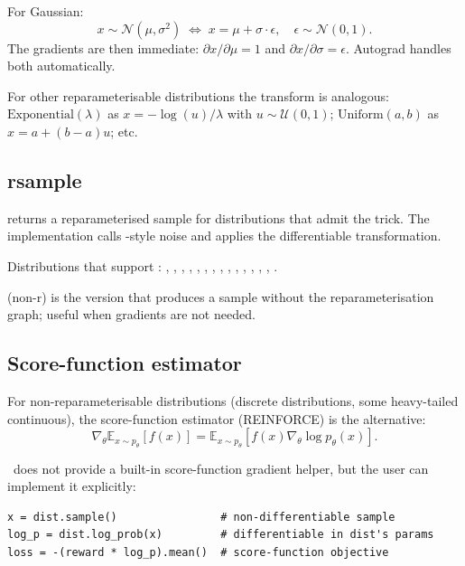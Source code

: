 For Gaussian:
\[
x \sim \mathcal{N}(\mu, \sigma^2)
\;\Longleftrightarrow\;
x = \mu + \sigma \cdot \epsilon,
\quad \epsilon \sim \mathcal{N}(0, 1).
\]
The gradients are then immediate:
$\partial x / \partial \mu = 1$ and $\partial x / \partial \sigma
= \epsilon$. Autograd handles both automatically.

For other reparameterisable distributions the transform is
analogous: $\mathrm{Exponential}(\lambda)$ as $x = -\log(u)/\lambda$
with $u \sim \mathcal{U}(0, 1)$; $\mathrm{Uniform}(a, b)$ as $x =
a + (b - a) u$; etc.

\subsection{rsample}
\label{ssec:distributions:rsample}

 returns a reparameterised sample for
distributions that admit the trick. The implementation calls
-style noise and applies the differentiable
transformation.

Distributions that support : ,
, , , ,
, , ,
, , ,
, , ,
.

 (non-r) is the version that produces a sample
without the reparameterisation graph; useful when gradients are
not needed.

\subsection{Score-function estimator}
\label{ssec:distributions:score_function}

For non-reparameterisable distributions (discrete distributions,
some heavy-tailed continuous), the score-function estimator
(REINFORCE) is the alternative:
\[
\nabla_\theta \mathbb{E}_{x \sim p_\theta}[f(x)] =
\mathbb{E}_{x \sim p_\theta}[f(x) \nabla_\theta \log p_\theta(x)].
\]

\Lucid\ does not provide a built-in score-function gradient
helper, but the user can implement it explicitly:

\begin{lstlisting}[style=lucid,language=LucidPython]
x = dist.sample()                # non-differentiable sample
log_p = dist.log_prob(x)         # differentiable in dist's params
loss = -(reward * log_p).mean()  # score-function objective
\end{lstlisting}

